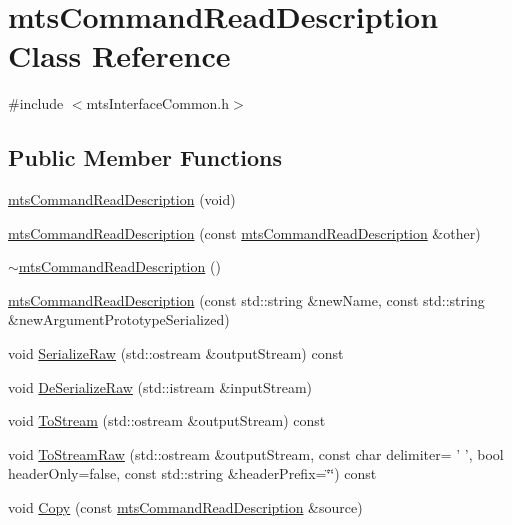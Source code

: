 \hypertarget{classmts_command_read_description}{\section{mts\-Command\-Read\-Description Class Reference}
\label{classmts_command_read_description}
}


{\ttfamily \#include $<$mts\-Interface\-Common.\-h$>$}

\subsection*{Public Member Functions}
\begin{DoxyCompactItemize}
\item 
\hyperlink{classmts_command_read_description_a1e192ede6156cad51e0e9925bbe8474c}{mts\-Command\-Read\-Description} (void)
\item 
\hyperlink{classmts_command_read_description_aac30c40d2eed4a5812e16c4deb437fc2}{mts\-Command\-Read\-Description} (const \hyperlink{classmts_command_read_description}{mts\-Command\-Read\-Description} \&other)
\item 
\hyperlink{classmts_command_read_description_afb74074fb43e40393b0a09a959df95e2}{$\sim$mts\-Command\-Read\-Description} ()
\item 
\hyperlink{classmts_command_read_description_abbc0564c967a93dcdee04aa06ceb9bf0}{mts\-Command\-Read\-Description} (const std\-::string \&new\-Name, const std\-::string \&new\-Argument\-Prototype\-Serialized)
\item 
void \hyperlink{classmts_command_read_description_af3627491add99f16d30ca55cfe289716}{Serialize\-Raw} (std\-::ostream \&output\-Stream) const 
\item 
void \hyperlink{classmts_command_read_description_ac51b9d6b37a38c92404cdfb2aa3e95fd}{De\-Serialize\-Raw} (std\-::istream \&input\-Stream)
\item 
void \hyperlink{classmts_command_read_description_a8284ce2923a7b3ec0b0076f4605f9759}{To\-Stream} (std\-::ostream \&output\-Stream) const 
\item 
void \hyperlink{classmts_command_read_description_ac5a18200fab7f42aaeb1bc1ba87a8798}{To\-Stream\-Raw} (std\-::ostream \&output\-Stream, const char delimiter= ' ', bool header\-Only=false, const std\-::string \&header\-Prefix=\char`\"{}\char`\"{}) const 
\item 
void \hyperlink{classmts_command_read_description_acd49530d944644f73220b4bc4c049451}{Copy} (const \hyperlink{classmts_command_read_description}{mts\-Command\-Read\-Description} \&source)

\end{DoxyCompactItemize}
